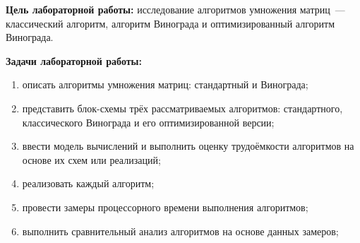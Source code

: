 

\textbf{Цель лабораторной работы:} исследование алгоритмов умножения матриц~--- классический алгоритм, алгоритм Винограда и оптимизированный алгоритм Винограда.

\textbf{Задачи лабораторной работы:}
\begin{enumerate}
	\item описать алгоритмы умножения матриц: стандартный и Винограда;
	\item представить блок-схемы трёх рассматриваемых алгоритмов: стандартного, классического Винограда и его оптимизированной версии;
	\item ввести модель вычислений и выполнить оценку трудоёмкости алгоритмов на основе их схем или реализаций;
	\item реализовать каждый алгоритм;
	\item провести замеры процессорного времени выполнения алгоритмов;
	\item выполнить сравнительный анализ алгоритмов на основе данных замеров;
\end{enumerate}

\clearpage
